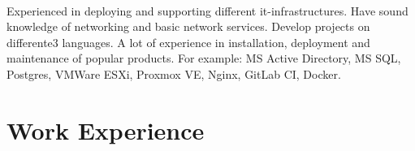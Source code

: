 \documentclass[a4paper]{twentysecondcv} %
\begin{document}
\makeprofile %
{\Huge\headingfont\color{headercolor}\cvjobtitle}

\paragraph{}
Experienced in deploying and supporting different it-infrastructures.
Have sound knowledge of networking and basic network services.
Develop projects on differente3                                         languages.
A lot of experience in installation, deployment and maintenance of popular products.
For example: MS Active Directory, MS SQL, Postgres, VMWare ESXi, Proxmox VE, Nginx, GitLab CI, Docker.


\section{Work Experience}
\end{document}
